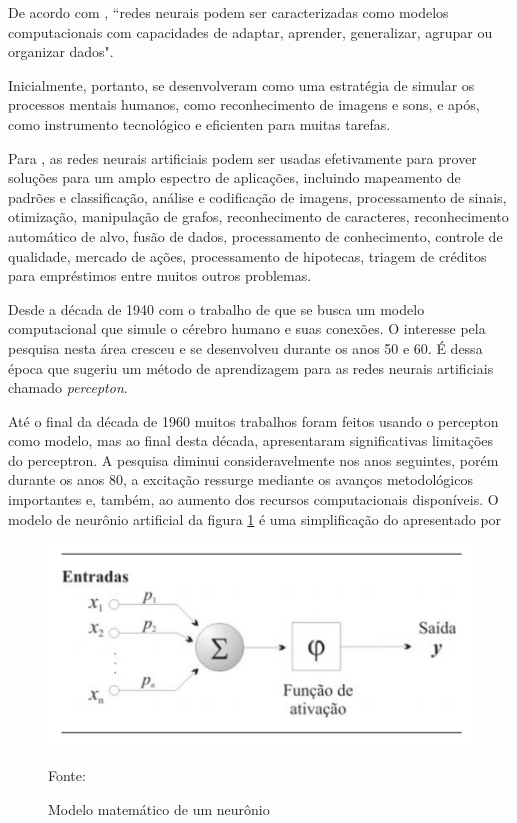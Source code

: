 De acordo com \cite[p. 47]{lima_ia_2016}, ``redes neurais podem ser caracterizadas como modelos computacionais com capacidades de adaptar, aprender, generalizar, agrupar ou organizar dados".

Inicialmente, portanto, se desenvolveram como uma estratégia de simular os processos mentais humanos, como reconhecimento de imagens e sons, e após, como instrumento tecnológico e eficienten para muitas tarefas. \cite{jin_development_2002}	

Para \cite{obaidat_multilayer_1994}, as redes neurais artificiais podem ser usadas efetivamente para prover soluções para um amplo espectro de aplicações, incluindo mapeamento de padrões e classificação, análise e codificação de imagens, processamento de sinais, otimização, manipulação de grafos, reconhecimento de caracteres, reconhecimento automático de alvo,  	fusão de dados, processamento de conhecimento, controle de qualidade, mercado de ações, processamento de hipotecas, triagem de créditos para empréstimos entre muitos outros problemas. 

Desde a década de 1940 com o trabalho de \cite{mcculloch_logical_1943} que se busca um modelo computacional que simule o cérebro humano e suas conexões. O interesse pela pesquisa nesta área cresceu e se desenvolveu durante os anos 50 e 60. É dessa época que \cite{rosenblatt_perceptron:_1958} sugeriu um método de aprendizagem para as redes neurais artificiais chamado \textit{percepton}. 

Até o final da década de 1960 muitos trabalhos foram feitos usando o percepton como modelo, mas ao final desta década, \cite{minsky_perceptrons:_1969} apresentaram significativas limitações do perceptron. A pesquisa diminui consideravelmente nos anos seguintes, porém durante  os  anos  80,  a excitação	ressurge mediante os avanços metodológicos importantes e, também, ao aumento dos recursos computacionais disponíveis. O  modelo  de  neurônio  artificial  da figura \ref{fig:neuronio} é uma
simplificação do apresentado por \cite[p. 36]{haykin_redes_2001}

\begin{figure}[h!]
	\centering
	\includegraphics[width=.7\textwidth]{imagens/modelo_matematico_neuronio.png}
	
	{\scriptsize Fonte:\cite[p. 36]{haykin_redes_2001}}
	\caption{Modelo matemático de um neurônio}
	\label{fig:neuronio}
\end{figure}

